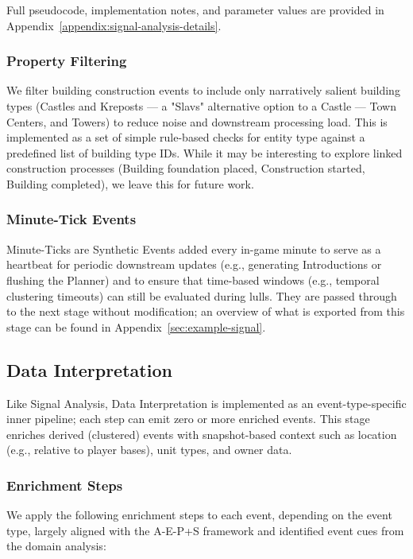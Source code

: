 Full pseudocode, implementation notes, and parameter values are provided in Appendix~\ref{appendix:signal-analysis-details}.

\subsubsection{Property Filtering}
We filter building construction events to include only narratively salient building types (Castles and Kreposts --- a "Slavs" alternative option to a Castle --- Town Centers, and Towers) to reduce noise and downstream processing load. This is implemented as a set of simple rule-based checks for entity type against a predefined list of building type IDs. While it may be interesting to explore linked construction processes (Building foundation placed, Construction started, Building completed), we leave this for future work.

\subsubsection{Minute-Tick Events}
Minute-Ticks are Synthetic Events added every in-game minute to serve as a heartbeat for periodic downstream updates (e.g., generating Introductions or flushing the Planner) and to ensure that time-based windows (e.g., temporal clustering timeouts) can still be evaluated during lulls. They are passed through to the next stage without modification; an overview of what is exported from this stage can be found in Appendix~\ref{sec:example-signal}.

\subsection{Data Interpretation}
Like Signal Analysis, Data Interpretation is implemented as an event-type-specific inner pipeline; each step can emit zero or more enriched events. This stage enriches derived (clustered) events with snapshot-based context such as location (e.g., relative to player bases), unit types, and owner data.
\subsubsection{Enrichment Steps}
We apply the following enrichment steps to each event, depending on the event type, largely aligned with the A-E-P+S framework and identified event cues from the domain analysis:

